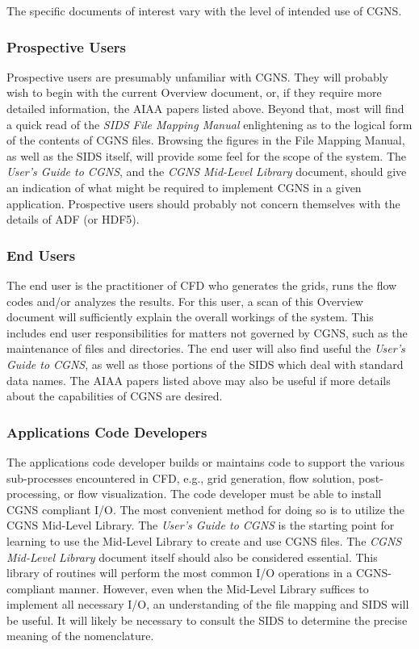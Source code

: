 \noindent
The specific documents of interest vary with the level of intended use
of CGNS.

\subsubsection{Prospective Users}

Prospective users are presumably unfamiliar with CGNS.
They will probably wish to begin with the current Overview document, or,
if they require more detailed information, the AIAA papers listed above.
Beyond that, most will find a quick read of the
\textit{SIDS File Mapping Manual}
enlightening as to the logical form of the contents of CGNS files.
Browsing the figures in the File
Mapping Manual, as well as the SIDS
itself, will provide some feel for the scope of the system.
The \textit{User's Guide to CGNS}, and
the \textit{CGNS Mid-Level Library}
document, should give an indication of what might be required to
implement CGNS in a given application.
Prospective users should probably not concern themselves with the
details of ADF (or HDF5).

\subsubsection{End Users}

The end user is the practitioner of CFD who generates the grids, runs
the flow codes and/or analyzes the results.
For this user, a scan of this Overview document will sufficiently
explain the overall workings of the system.
This includes end user responsibilities for matters not governed by
CGNS, such as the maintenance of files and directories.
The end user will also find useful the
\textit{User's Guide to CGNS}, as
well as those portions of the SIDS
which deal with standard data names.
The AIAA papers listed above may also be useful if more details about
the capabilities of CGNS are desired.

\subsubsection{Applications Code Developers}

The applications code developer builds or maintains code to support the
various sub-processes encountered in CFD, e.g., grid generation, flow
solution, post-processing, or flow visualization.
The code developer must be able to install CGNS compliant I/O.
The most convenient method for doing so is to utilize the CGNS Mid-Level
Library.
The \textit{User's Guide to CGNS} is the
starting point for learning to use the Mid-Level Library to create and
use CGNS files.
The \textit{CGNS Mid-Level Library}
document itself should also be considered essential.
This library of routines will perform the most common I/O operations in
a CGNS-compliant manner.
However, even when the Mid-Level Library suffices to implement all
necessary I/O, an understanding of the
file mapping and SIDS will be useful.
It will likely be necessary to consult the
SIDS to determine the precise meaning
of the nomenclature.

